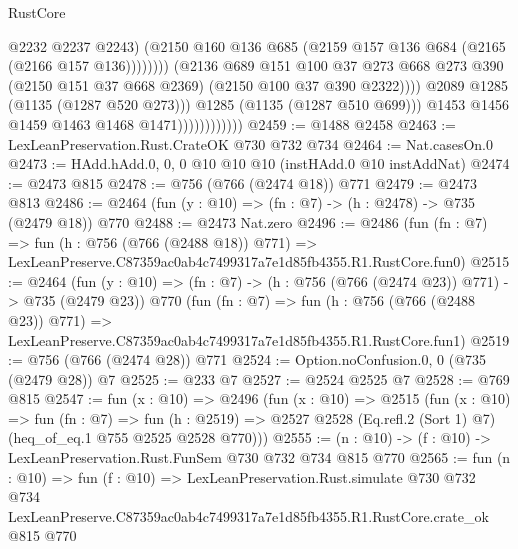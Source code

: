 \begin{lexlean}{RustCore}
\begin{coremodule}
                                              @2232
                                              @2237
                                              @2243)
                                            (@2150
                                              @160
                                              @136
                                              @685
                                              (@2159 @157 @136 @684 (@2165 (@2166 @157 @136))))))))
                                    (@2136
                                      @689
                                      @151
                                      @100
                                      @37
                                      @273
                                      @668
                                      @273
                                      @390
                                      (@2150 @151 @37 @668 @2369)
                                      (@2150 @100 @37 @390 @2322))))
                                @2089
                                @1285
                                (@1135 (@1287 @520 @273)))
                              @1285
                              (@1135 (@1287 @510 @699)))
                            @1453
                            @1456
                            @1459
                            @1463
                            @1468
                            @1471))))))))))))
@2459 := @1488 @2458
@2463 := LexLeanPreservation.Rust.CrateOK @730 @732 @734
@2464 := Nat.casesOn.{0}
@2473 := HAdd.hAdd.{0, 0, 0} @10 @10 @10 (instHAdd.{0} @10 instAddNat)
@2474 := @2473 @815
@2478 := @756 (@766 (@2474 @18)) @771
@2479 := @2473 @813
@2486 := @2464 (fun (y : @10) => (fn : @7) -> (h : @2478) -> @735 (@2479 @18)) @770
@2488 := @2473 Nat.zero
@2496 := @2486
    (fun (fn : @7) =>
    fun (h : @756 (@766 (@2488 @18)) @771) =>
    LexLeanPreserve.C87359ac0ab4c7499317a7e1d85fb4355.R1.RustCore.fun0)
@2515 := @2464
    (fun (y : @10) => (fn : @7) -> (h : @756 (@766 (@2474 @23)) @771) -> @735 (@2479 @23))
    @770
    (fun (fn : @7) =>
    fun (h : @756 (@766 (@2488 @23)) @771) =>
    LexLeanPreserve.C87359ac0ab4c7499317a7e1d85fb4355.R1.RustCore.fun1)
@2519 := @756 (@766 (@2474 @28)) @771
@2524 := Option.noConfusion.{0, 0} (@735 (@2479 @28)) @7
@2525 := @233 @7
@2527 := @2524 @2525 @7
@2528 := @769 @815
@2547 := fun (x : @10) =>
  @2496
    (fun (x : @10) =>
    @2515
      (fun (x : @10) =>
      fun (fn : @7) =>
      fun (h : @2519) =>
      @2527 @2528 (Eq.refl.{2} (Sort 1) @7) (heq_of_eq.{1} @755 @2525 @2528 @770)))
@2555 := (n : @10) -> (f : @10) -> LexLeanPreservation.Rust.FunSem @730 @732 @734 @815 @770
@2565 := fun (n : @10) =>
  fun (f : @10) =>
  LexLeanPreservation.Rust.simulate
    @730
    @732
    @734
    LexLeanPreserve.C87359ac0ab4c7499317a7e1d85fb4355.R1.RustCore.crate_ok
    @815
    @770
\end{coremodule}
\end{lexlean}
